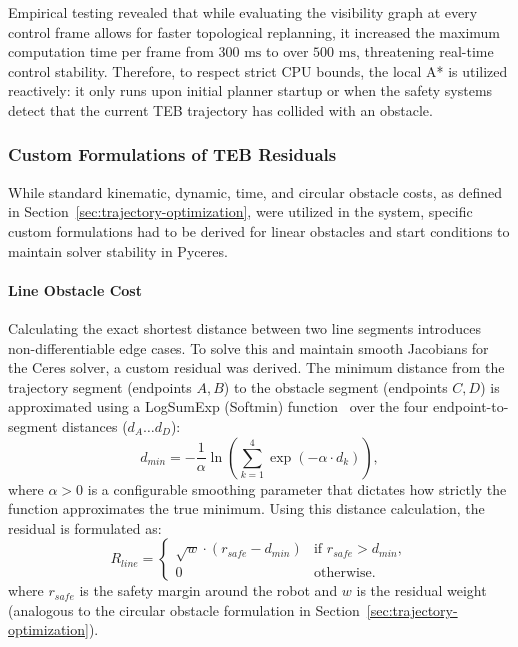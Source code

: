 Empirical testing revealed that while evaluating the visibility graph at every control frame allows for faster topological replanning, it increased the maximum computation time per frame from $300\text{ ms}$ to over $500\text{ ms}$, threatening real-time control stability. Therefore, to respect strict CPU bounds, the local A* is utilized reactively: it only runs upon initial planner startup or when the safety systems detect that the current TEB trajectory has collided with an obstacle.

\subsubsection{Custom Formulations of TEB Residuals}
\label{subsubsec:custom-residuals}
While standard kinematic, dynamic, time, and circular obstacle costs, as defined in Section~\ref{sec:trajectory-optimization}, were utilized in the system, specific custom formulations had to be derived for linear obstacles and start conditions to maintain solver stability in Pyceres.

\paragraph{Line Obstacle Cost}

Calculating the exact shortest distance between two line segments introduces non-differentiable edge cases. To solve this and maintain smooth Jacobians for the Ceres solver, a custom residual was derived. The minimum distance from the trajectory segment (endpoints $A, B$) to the obstacle segment (endpoints $C, D$) is approximated using a LogSumExp (Softmin) function~\cite{boyd_vandenberghe_2004} over the four endpoint-to-segment distances ($d_A \dots d_D$):
\begin{equation}
    d_{min} = -\frac{1}{\alpha} \ln \left( \sum_{k=1}^4 \exp(-\alpha \cdot d_k) \right),
\end{equation}
where $\alpha > 0$ is a configurable smoothing parameter that dictates how strictly the function approximates the true minimum. Using this distance calculation, the residual is formulated as:
\begin{equation}
    R_{line} = \begin{cases}
        \sqrt{w} \cdot (r_{safe} - d_{min}) & \text{if } r_{safe} > d_{min}, \\
        0                                   & \text{otherwise}.
    \end{cases}
\end{equation}
where $r_{safe}$ is the safety margin around the robot and $w$ is the residual weight (analogous to the circular obstacle formulation in Section~\ref{sec:trajectory-optimization}).

